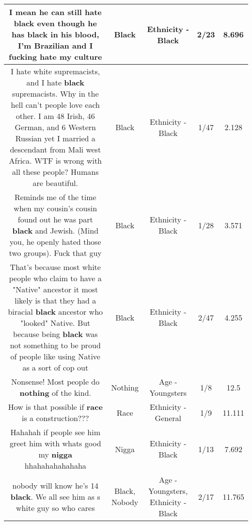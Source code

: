\documentclass[11pt]{article}
\newlength\mylength
\begin{document}
\begin{center}
\begin{longtable}{|C{.65\mylength}|C{.30\mylength}|C{.12\mylength}|C{.12\mylength}|C{.12\mylength}|}
  \small I mean he can still hate \textbf{black} even though he has \textbf{black} in his blood, I'm Brazilian and I fucking hate my culture\normalsize   & Black & Ethnicity - Black & 2/23 & 8.696 \\  \hline
  \small I hate white supremacists, and I hate \textbf{black} supremacists. Why in the hell can't people love each other. I am 48 Irish, 46 German, and 6 Western Russian yet I married a descendant from Mali west Africa. WTF is wrong with all these people? Humans are beautiful.\normalsize   & Black & Ethnicity - Black & 1/47 & 2.128 \\  \hline
  \small Reminds me of the time when my cousin's cousin found out he was part \textbf{black} and Jewish. (Mind you, he openly hated those two groups). Fuck that guy\normalsize   & Black & Ethnicity - Black & 1/28 & 3.571 \\  \hline
  \small That's because most white people who claim to have a "Native" ancestor it most likely is that they had a biracial \textbf{black} ancestor who "looked" Native. But because being \textbf{black} was not something to be proud of people like using Native as a sort of cop out\normalsize   & Black & Ethnicity - Black & 2/47 & 4.255 \\  \hline
  \small Nonsense!  Most people do \textbf{nothing} of the kind.\normalsize   & Nothing & Age - Youngsters & 1/8 & 12.5 \\  \hline
  \small How is that possible if \textbf{race} is a construction???\normalsize   & Race & Ethnicity - General & 1/9 & 11.111 \\  \hline
  \small Hahahah if people see him greet him with whats good my \textbf{nigga} hhahahahahahaha\normalsize   & Nigga & Ethnicity - Black & 1/13 & 7.692 \\  \hline
  \small nobody will know he's 14 \textbf{black}. We all see him as s white guy so who cares\normalsize   & Black, Nobody & Age - Youngsters, Ethnicity - Black & 2/17 & 11.765 \\  \hline

\end{longtable}
\end{center}
\end{document}
